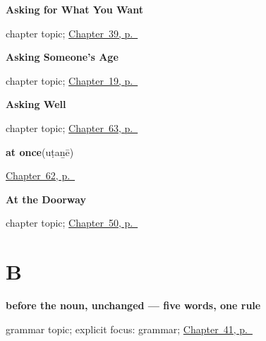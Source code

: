 \noindent\begin{minipage}[t]{\linewidth}
\raggedright
\textbf{Asking for What You Want}\par
\footnotesize chapter topic; \hyperref[ch:ta-asking-for-what-you-want]{Chapter~39, p.~\pageref*{ch:ta-asking-for-what-you-want}}
\end{minipage}\par\smallskip

\noindent\begin{minipage}[t]{\linewidth}
\raggedright
\textbf{Asking Someone's Age}\par
\footnotesize chapter topic; \hyperref[ch:ta-asking-age]{Chapter~19, p.~\pageref*{ch:ta-asking-age}}
\end{minipage}\par\smallskip

\noindent\begin{minipage}[t]{\linewidth}
\raggedright
\textbf{Asking Well}\par
\footnotesize chapter topic; \hyperref[ch:ta-asking-well]{Chapter~63, p.~\pageref*{ch:ta-asking-well}}
\end{minipage}\par\smallskip

\noindent\begin{minipage}[t]{\linewidth}
\raggedright
\textbf{at once}\enspace\emph{}\enspace(uṭaṉē)\par
\footnotesize \hyperref[ch:ta-only-and-still]{Chapter~62, p.~\pageref*{ch:ta-only-and-still}}
\end{minipage}\par\smallskip

\noindent\begin{minipage}[t]{\linewidth}
\raggedright
\textbf{At the Doorway}\par
\footnotesize chapter topic; \hyperref[ch:ta-at-the-doorway]{Chapter~50, p.~\pageref*{ch:ta-at-the-doorway}}
\end{minipage}\par\smallskip

\section*{B}

\noindent\begin{minipage}[t]{\linewidth}
\raggedright
\textbf{before the noun, unchanged — five words, one rule}\par
\footnotesize grammar topic; explicit focus: grammar; \hyperref[ch:ta-describing-things]{Chapter~41, p.~\pageref*{ch:ta-describing-things}}
\end{minipage}\par\smallskip

